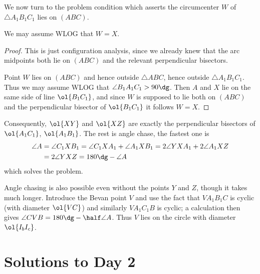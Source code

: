 We now turn to the problem condition
which asserts the circumcenter $W$ of $\triangle A_1B_1C_1$
lies on $(ABC)$.
\begin{claim*}
  We may assume WLOG that $W = X$.
\end{claim*}
\begin{proof}
  This is just configuration analysis,
  since we already knew that the arc midpoints
  both lie on $(ABC)$ and the relevant perpendicular bisectors.

  Point $W$ lies on $(ABC)$ and hence outside $\triangle ABC$,
  hence outside $\triangle A_1 B_1 C_1$.
  Thus we may assume WLOG that $\angle B_1 A_1 C_1 > 90\dg$.
  Then $A$ and $X$ lie on the same side of line $\ol{B_1 C_1}$,
  and since $W$ is supposed to lie both on $(ABC)$
  and the perpendicular bisector of $\ol{B_1C_1}$ it follows $W = X$.
\end{proof}

Consequently, $\ol{XY}$ and $\ol{XZ}$
are exactly the perpendicular bisectors
of $\ol{A_1 C_1}$, $\ol{A_1 B_1}$.
The rest is angle chase, the fastest one is
\begin{align*}
  \angle A &= \angle C_1 X B_1
  = \angle C_1 X A_1 + \angle A_1 X B_1
  = 2 \angle YXA_1 + 2 \angle A_1 X Z \\
  &= 2 \angle YXZ =  180\dg - \angle A
\end{align*}
which solves the problem.

\begin{remark*}
  Angle chasing is also possible even without
  the points $Y$ and $Z$, though it takes much longer.
  Introduce the Bevan point $V$ and use the fact
  that $VA_1B_1C$ is cyclic (with diameter $\ol{VC}$)
  and similarly $VA_1C_1B$ is cyclic;
  a calculation then gives $\angle CVB = 180\dg - \half \angle A$.
  Thus $V$ lies on the circle with diameter $\ol{I_b I_c}$.
\end{remark*}
\pagebreak

\section{Solutions to Day 2}